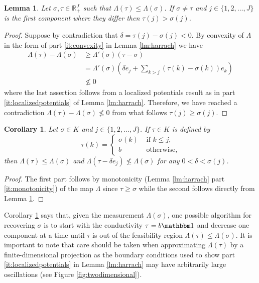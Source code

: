 \documentclass{article}
\newtheorem{corollary}[theorem]{Corollary}
\newtheorem{lemma}[theorem]{Lemma}
\theoremstyle{definition}
\theoremstyle{remark}
\renewcommand{\leq}{\leqslant}
\renewcommand{\geq}{\geqslant}
\newcommand{\ones}{\mathbbm1}
\begin{document}
\begin{lemma}\label{lm:positivity}
Let $\sigma,\tau\in \mathbb R^J_+$ such that $\Lambda(\tau)\leq\Lambda(\sigma)$.
If $\sigma\neq\tau$ and $j\in\{1,2,\dots,J\}$ is the first component where they differ then $\tau(j) > \sigma(j)$.
\end{lemma}
\begin{proof}
Suppose by contradiction that $\delta = \tau(j) - \sigma(j) < 0$.
By convexity of $\Lambda$ in the form of part \ref{it:convexity} in Lemma \ref{lm:harrach} we have
\begin{align*}
\Lambda(\tau) - \Lambda(\sigma) &\geq \Lambda'(\sigma)(\tau-\sigma) \\
&= \Lambda'(\sigma)\left(\delta e_j + \sum_{k>j}(\tau(k)-\sigma(k))e_k \right) \\
&\not\leq 0
\end{align*}
where the last assertion follows from a localized potentials result as in part \ref{it:localizedpotentials} of Lemma \ref{lm:harrach}.
Therefore, we have reached a contradiction $\Lambda(\tau)-\Lambda(\sigma) \not\leq0$ from what follows $\tau(j)\geq \sigma(j)$.
\end{proof}
\begin{corollary}\label{cr:coordinate}
Let $\sigma\in K$ and $j\in\{1,2,\dots,J\}$.
If $\tau\in K$ is defined by
$$
\tau(k) = \begin{cases}
\sigma(k) &\text{ if }k\leq j, \\
b &\text{ otherwise},
\end{cases}
$$
then $\Lambda(\tau)\leq\Lambda(\sigma)$ and $\Lambda(\tau - \delta e_j) \not\leq \Lambda(\sigma)$ for any $0<\delta<\sigma(j)$.
\end{corollary}
\begin{proof}
The first part follows by monotonicity (Lemma \ref{lm:harrach} part \ref{it:monotonicity}) of the map $\Lambda$ since $\tau\geq\sigma$ while the second follows directly from Lemma \ref{lm:positivity}.
\end{proof}
Corollary \ref{cr:coordinate} says that, given the measurement $\Lambda(\sigma)$, one possible algorithm for recovering $\sigma$ is to start with the conductivity $\tau = b\ones$ and decrease one component at a time until $\tau$ is out of the feasibility region $\Lambda(\tau)\leq \Lambda(\sigma)$.
It is important to note that care should be taken when approximating $\Lambda(\tau)$ by a finite-dimensional projection as the boundary conditions used to show part \ref{it:localizedpotentials} in Lemma \ref{lm:harrach} may have arbitrarily large oscillations (see Figure \ref{fig:twodimensional}).
\end{document}
